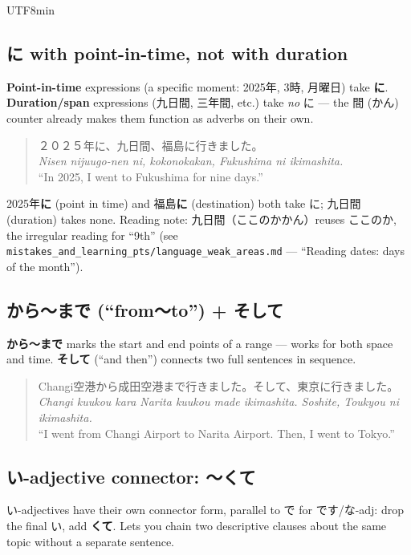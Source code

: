 \documentclass[11pt]{article}
\begin{document}
\begin{CJK}{UTF8}{min}
\subsection{\texorpdfstring{に}{ni} with point-in-time, not with duration}
\textbf{Point-in-time} expressions (a specific moment: 2025年, 3時, 月曜日)
take \textbf{に}. \textbf{Duration/span} expressions (九日間, 三年間, etc.)
take \emph{no} に --- the 間 (かん) counter already makes them function as
adverbs on their own.

\begin{quote}
２０２５年に、九日間、福島に行きました。\\
\emph{Nisen nijuugo-nen ni, kokonokakan, Fukushima ni ikimashita.}\\
``In 2025, I went to Fukushima for nine days.''
\end{quote}

2025年\textbf{に} (point in time) and 福島\textbf{に} (destination) both take
に; 九日間 (duration) takes none. Reading note: 九日間（ここのかかん）reuses
ここのか, the irregular reading for ``9th'' (see
\texttt{mistakes\_and\_learning\_pts/language\_weak\_areas.md} ---
``Reading dates: days of the month'').

\subsection{\texorpdfstring{から〜まで}{kara~made} (``from〜to'') + \texorpdfstring{そして}{soshite}}
\textbf{から〜まで} marks the start and end points of a range --- works for
both space and time. \textbf{そして} (``and then'') connects two full
sentences in sequence.

\begin{quote}
Changi空港から成田空港まで行きました。そして、東京に行きました。\\
\emph{Changi kuukou kara Narita kuukou made ikimashita. Soshite, Toukyou ni
ikimashita.}\\
``I went from Changi Airport to Narita Airport. Then, I went to Tokyo.''
\end{quote}

\subsection{い-adjective connector: \texorpdfstring{〜くて}{-kute}}
い-adjectives have their own connector form, parallel to で for です/な-adj:
drop the final い, add \textbf{くて}. Lets you chain two descriptive clauses
about the same topic without a separate sentence.


\end{CJK}
\end{document}
